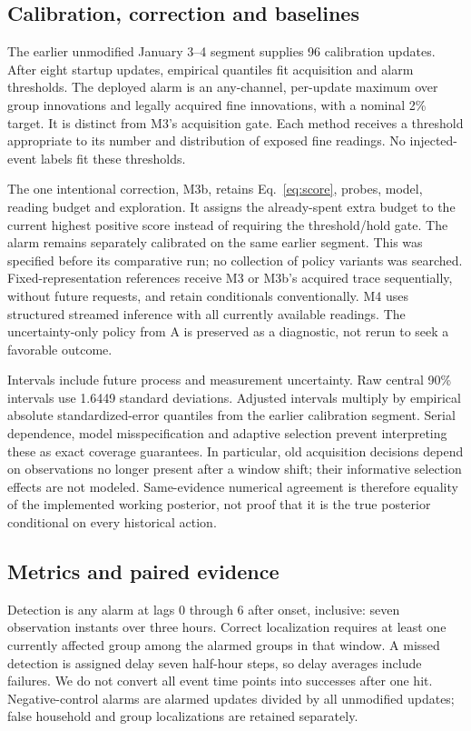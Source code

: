 \documentclass[conference]{IEEEtran}
\begin{document}
\subsection{Calibration, correction and baselines}
The earlier unmodified January 3--4 segment supplies 96 calibration updates. After eight startup updates, empirical quantiles fit acquisition and alarm thresholds. The deployed alarm is an any-channel, per-update maximum over group innovations and legally acquired fine innovations, with a nominal 2\% target. It is distinct from M3's acquisition gate. Each method receives a threshold appropriate to its number and distribution of exposed fine readings. No injected-event labels fit these thresholds.

The one intentional correction, M3b, retains Eq.~\eqref{eq:score}, probes, model, reading budget and exploration. It assigns the already-spent extra budget to the current highest positive score instead of requiring the threshold/hold gate. The alarm remains separately calibrated on the same earlier segment. This was specified before its comparative run; no collection of policy variants was searched. Fixed-representation references receive M3 or M3b's acquired trace sequentially, without future requests, and retain conditionals conventionally. M4 uses structured streamed inference with all currently available readings. The uncertainty-only policy from A is preserved as a diagnostic, not rerun to seek a favorable outcome.

Intervals include future process and measurement uncertainty. Raw central 90\% intervals use 1.6449 standard deviations. Adjusted intervals multiply by empirical absolute standardized-error quantiles from the earlier calibration segment. Serial dependence, model misspecification and adaptive selection prevent interpreting these as exact coverage guarantees. In particular, old acquisition decisions depend on observations no longer present after a window shift; their informative selection effects are not modeled. Same-evidence numerical agreement is therefore equality of the implemented working posterior, not proof that it is the true posterior conditional on every historical action.

\subsection{Metrics and paired evidence}
Detection is any alarm at lags 0 through 6 after onset, inclusive: seven observation instants over three hours. Correct localization requires at least one currently affected group among the alarmed groups in that window. A missed detection is assigned delay seven half-hour steps, so delay averages include failures. We do not convert all event time points into successes after one hit. Negative-control alarms are alarmed updates divided by all unmodified updates; false household and group localizations are retained separately.
\end{document}
